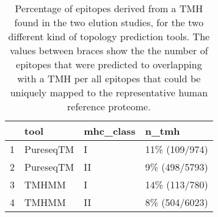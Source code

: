 \begin{table}[ht]
\centering
\begin{tabular}{rlll}
  \hline
 & tool & mhc\_class & n\_tmh \\ 
  \hline
1 & PureseqTM & I & 11\% (109/974) \\ 
  2 & PureseqTM & II & 9\% (498/5793) \\ 
  3 & TMHMM & I & 14\% (113/780) \\ 
  4 & TMHMM & II & 8\% (504/6023) \\ 
   \hline
\end{tabular}
\caption{Percentage of epitopes derived from a TMH found in the two elution studies, for the two different kind of topology prediction tools. The values between braces show the the number of epitopes that were predicted to overlapping with a TMH per all epitopes that could be uniquely mapped to the representative human reference proteome.} 
\label{tab:elution}
\end{table}
